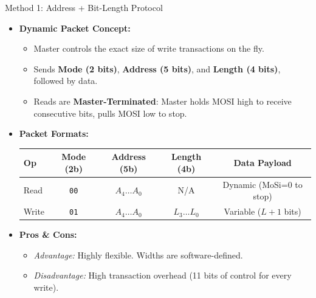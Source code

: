 \documentclass{beamer}
\begin{document}
\begin{frame}{Method 1: Address + Bit-Length Protocol}
  \begin{itemize}
    \item \textbf{Dynamic Packet Concept:} 
    \begin{itemize}
      \item Master controls the exact size of write transactions on the fly.
      \item Sends \textbf{Mode (2 bits)}, \textbf{Address (5 bits)}, and \textbf{Length (4 bits)}, followed by data.
      \item Reads are \textbf{Master-Terminated}: Master holds MOSI high to receive consecutive bits, pulls MOSI low to stop.
    \end{itemize}
    \item \textbf{Packet Formats:}
    \begin{table}
      \centering\tiny
      \begin{tabular}{lcccc}
        \toprule
        \textbf{Op} & \textbf{Mode (2b)} & \textbf{Address (5b)} & \textbf{Length (4b)} & \textbf{Data Payload} \\
        \midrule
        Read & \texttt{00} & $A_4 \dots A_0$ & N/A & Dynamic (MoSi=0 to stop) \\
        Write & \texttt{01} & $A_4 \dots A_0$ & $L_3 \dots L_0$ & Variable ($L+1$ bits) \\
        \bottomrule
      \end{tabular}
    \end{table}
    \item \textbf{Pros \& Cons:} 
    \begin{itemize}
      \item \textit{Advantage:} Highly flexible. Widths are software-defined.
      \item \textit{Disadvantage:} High transaction overhead (11 bits of control for every write).
    \end{itemize}
  \end{itemize}
\end{frame}
\end{document}
